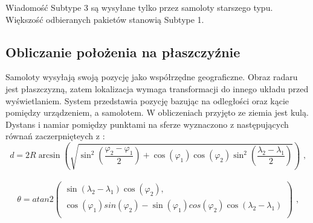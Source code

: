 \documentclass[eng,printmode]{mgr}
\begin{document}
Wiadomość Subtype 3 są wysyłane tylko przez samoloty starszego typu. Większość odbieranych pakietów stanowią Subtype 1.

\subsection*{Obliczanie położenia na płaszczyźnie}
Samoloty wysyłają swoją pozycję jako współrzędne geograficzne. Obraz radaru jest płaszczyzną, zatem lokalizacja wymaga transformacji do innego układu przed wyświetlaniem. System przedstawia pozycję bazując na odległości oraz kącie pomiędzy urządzeniem, a samolotem. W obliczeniach przyjęto ze ziemia jest kulą.
Dystans i namiar pomiędzy punktami na sferze wyznaczono z następujących równań zaczerpnięteych z \cite{posCalc}:
\\


\begin{equation}
d = 2R\arcsin\left(\sqrt{\sin^2\left(\frac{\varphi_2 - \varphi_1}{2}\right)
+ \cos\left(\varphi_1\right)\cos\left(\varphi_2\right)
\sin^2\left(\frac{\lambda_2 - \lambda_1}{2}\right)}\right) \textrm{ ,}\label{eq:dystans}
\end{equation}
\\

\begin{equation}
\renewcommand*{\arraystretch}{1.3}
\theta = atan2\left( \begin{array}{ll}
\sin\left(\lambda_2 - \lambda_1\right)\cos\left(\varphi_2\right),\\
\cos\left(\varphi_1\right)sin\left(\varphi_2\right)-
\sin\left(\varphi_1\right)cos\left(\varphi_2\right)
\cos\left(\lambda_2 - \lambda_1\right)\\
\end{array}
\right) \textrm{ ,}
\end{equation}  
\end{document}
